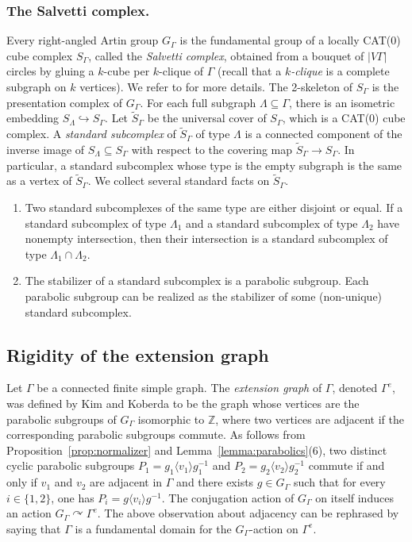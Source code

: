\documentclass[11pt]{article}
\numberwithin{equation}{section}
\theoremstyle{plain}
\theoremstyle{definition}
\let\actson\curvearrowright
\begin{document}
\subsubsection*{The Salvetti complex.} Every right-angled Artin group $G_\Gamma$ is the fundamental group of a locally CAT(0) cube complex $S_\Gamma$, called the \emph{Salvetti complex}, obtained from a bouquet of $|V\Gamma|$ circles by gluing a $k$-cube per $k$-clique of $\Gamma$ (recall that a \emph{$k$-clique} is a complete subgraph on $k$ vertices). We refer to \cite[\S 3.6]{charney2007introduction} for more details. The 2-skeleton of $S_\Gamma$ is the presentation complex of $G_\Gamma$. For each full subgraph $\Lambda\subseteq \Gamma$, there is an isometric embedding $S_{\Lambda}\hookrightarrow S_\Gamma$. Let $\widetilde{S}_\Gamma$ be the universal cover of $S_\Gamma$, which is a CAT(0) cube complex. A \emph{standard subcomplex} of $\widetilde{S}_\Gamma$ of type $\Lambda$ is a connected component of the inverse image of $S_{\Lambda}\subseteq S_\Gamma$ with respect to the covering map $\widetilde{S}_\Gamma\to S_\Gamma$. In particular, a standard subcomplex whose type is the empty subgraph is the same as a vertex of $\widetilde{S}_\Gamma$. We collect several standard facts on $\widetilde{S}_\Gamma$.
\begin{enumerate}
\item Two standard subcomplexes of the same type are either disjoint or equal. If a standard subcomplex of type $\Lambda_1$ and a standard subcomplex of type $\Lambda_2$ have nonempty intersection, then their intersection is a standard subcomplex of type $\Lambda_1\cap\Lambda_2$.
\item The stabilizer of a standard subcomplex is a parabolic subgroup. Each parabolic subgroup can be realized as the stabilizer of some (non-unique) standard subcomplex.
\end{enumerate}

\subsection{Rigidity of the extension graph}\label{sec:rigidity}

Let $\Gamma$ be a connected finite simple graph. The \emph{extension graph} of $\Gamma$, denoted $\Gamma^e$, was defined by Kim and Koberda \cite{kim2013embedability} to be the graph whose vertices are the parabolic subgroups of $G_\Gamma$ isomorphic to $\mathbb Z$, where two vertices are adjacent if the corresponding parabolic subgroups commute. As follows from Proposition~\ref{prop:normalizer} and Lemma~\ref{lemma:parabolics}(6), two distinct cyclic parabolic subgroups $P_1=g_1\langle v_1\rangle g_1^{-1}$ and $P_2=g_2\langle v_2\rangle g_2^{-1}$ commute if and only if $v_1$ and $v_2$ are adjacent in $\Gamma$ and there exists $g\in G_\Gamma$ such that for every $i\in\{1,2\}$, one has $P_i=g\langle v_i\rangle g^{-1}$. The conjugation action of $G_\Gamma$ on itself induces an action $G_\Gamma\actson \Gamma^e$. The above observation about adjacency can be rephrased by saying that $\Gamma$ is a fundamental domain for the $G_\Gamma$-action on $\Gamma^e$.
\end{document}
